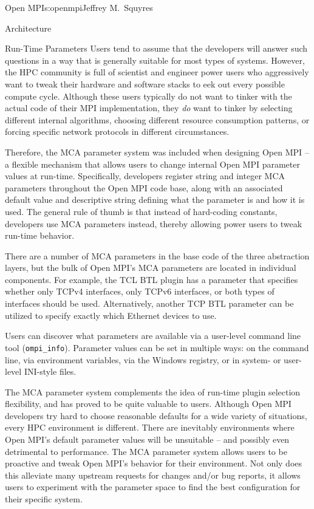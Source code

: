 \begin{aosachapter}{Open MPI}{s:openmpi}{Jeffrey M.\ Squyres}
\begin{aosasect1}{Architecture}
\begin{aosasect2}{Run-Time Parameters}
Users tend to assume that the developers will answer such questions in
a way that is generally suitable for most types of systems.
%
However, the HPC community is full of scientist and engineer power
users who aggressively want to tweak their hardware and software
stacks to eek out every possible compute cycle.
%
Although these users typically do not want to tinker with the actual
code of their MPI implementation, they {\em do} want to tinker by
selecting different internal algorithms, choosing different resource
consumption patterns, or forcing specific network protocols in
different circumstances.

Therefore, the MCA parameter system was included when designing Open
MPI -- a flexible mechanism that allows users to change internal Open
MPI parameter values at run-time.
%
Specifically, developers register string and integer MCA parameters
throughout the Open MPI code base, along with an associated default
value and descriptive string defining what the parameter is and how it
is used.
%
The general rule of thumb is that instead of hard-coding constants,
developers use MCA parameters instead, thereby allowing power users to
tweak run-time behavior.

There are a number of MCA parameters in the base code of the three
abstraction layers, but the bulk of Open MPI's MCA parameters are
located in individual components.
%
For example, the TCL BTL plugin has a parameter that specifies whether
only TCPv4 interfaces, only TCPv6 interfaces, or both types of
interfaces should be used.
%
Alternatively, another TCP BTL parameter can be utilized to specify
exactly which Ethernet devices to use.

Users can discover what parameters are available via a user-level
command line tool ({\tt ompi\_\-info}).
%
Parameter values can be set in multiple ways: on the command line, via
environment variables, via the Windows registry, or in system- or
user-level INI-style files.

The MCA parameter system complements the idea of run-time plugin
selection flexibility, and has proved to be quite valuable to users.
%
Although Open MPI developers try hard to choose reasonable defaults
for a wide variety of situations, every HPC environment is different.
There are inevitably environments where Open MPI's default parameter
values will be unsuitable -- and possibly even detrimental to
performance.
%
The MCA parameter system allows users to be proactive and tweak Open
MPI's behavior for their environment.  Not only does this alleviate
many upstream requests for changes and/or bug reports, it allows users
to experiment with the parameter space to find the best configuration
for their specific system.


\end{aosasect2}
\end{aosasect1}
\end{aosachapter}
